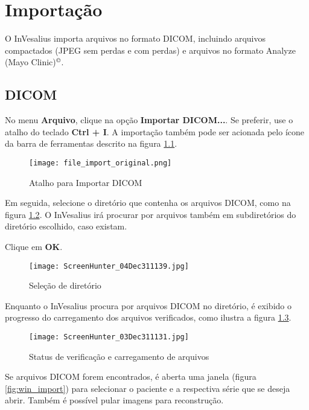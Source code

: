 \chapter{Importação}

O InVesalius importa arquivos no formato DICOM, incluindo arquivos compactados (JPEG sem perdas e
com perdas) e arquivos no formato Analyze (Mayo Clinic)$^\copyright$.

\section{DICOM}

No menu \textbf{Arquivo}, clique na opção \textbf{Importar DICOM...}. Se preferir, use o atalho
do teclado \textbf{Ctrl + I}. A importação também pode ser acionada pelo ícone da barra de ferramentas
descrito na figura \ref{fig:import}.

\begin{figure}[!htb]
\centering
\texttt{[image: file\_import\_original.png]}
\caption{Atalho para Importar DICOM}
\label{fig:import}
\end{figure}

\hspace{.2cm}

Em seguida, selecione o diretório que contenha os arquivos DICOM, como na figura \ref{fig:win_folder}.
O InVesalius irá procurar por arquivos também em subdiretórios do diretório escolhido, caso existam.

\newpage

Clique em \textbf{OK}.

\begin{figure}[!htb]
\centering
\texttt{[image: ScreenHunter\_04Dec311139.jpg]}
\caption{Seleção de diretório}
\label{fig:win_folder}
\end{figure}

\hspace{.2cm}

Enquanto o InVesalius procura por arquivos DICOM no diretório, é exibido o progresso
do carregamento dos arquivos verificados, como ilustra a figura \ref{fig:ver_file}.

\begin{figure}[!htb]
\centering
\texttt{[image: ScreenHunter\_03Dec311131.jpg]}
\caption{Status de verificação e carregamento de arquivos}
\label{fig:ver_file}
\end{figure}

\newpage

Se arquivos DICOM forem encontrados, é aberta uma janela (figura \ref{fig:win_import})
para selecionar o paciente e a respectiva série que se deseja abrir. Também é possível
pular imagens para reconstrução.

